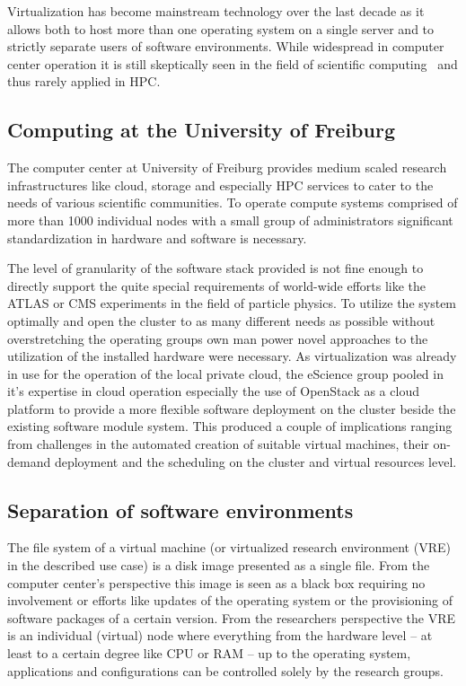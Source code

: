 Virtualization has become mainstream technology over the last decade as it allows
both to host more than one operating system on a single server and to strictly
separate users of software environments. While widespread in computer center
operation it is still skeptically seen in the field of scientific computing~\cite{VirtualisationScientificComp} and
thus rarely applied in HPC.

\subsection{Computing at the University of Freiburg}

The computer center at University of Freiburg provides
medium scaled research
infrastructures like cloud, storage and especially HPC services to cater to the
needs of various scientific communities. To operate compute systems comprised of
more than 1000 individual nodes with a small group of administrators
significant standardization in hardware and software is necessary.

The level of granularity of the software stack provided is not fine enough to
directly support the quite special requirements of world-wide efforts like the
ATLAS or CMS experiments in the field of particle physics. To utilize the system
optimally and open the cluster to as many different needs as possible without
overstretching the operating groups own man power novel approaches to the
utilization of the installed hardware were necessary. As virtualization was
already in use for the operation of the local private cloud, the eScience group
pooled in it's expertise in cloud operation especially the use of OpenStack as a
cloud platform to provide a more flexible software deployment on the cluster
beside the existing software module system. This produced a couple of
implications ranging from challenges in the automated creation of suitable
virtual machines, their on-demand deployment and the scheduling on the cluster
and virtual resources level.

\subsection{Separation of software environments}

The file system of a virtual machine (or virtualized research environment (VRE) in the described use case) is a
disk image presented as a single file. From the computer center's perspective
this image is seen as a black box requiring no involvement or efforts like
updates of the operating system or the provisioning of software packages of a
certain version. From the researchers perspective the VRE is an individual
(virtual) node where everything from the hardware level -- at least to a
certain degree like CPU or RAM -- up to the operating system,
applications and configurations can be controlled solely by the research groups.

